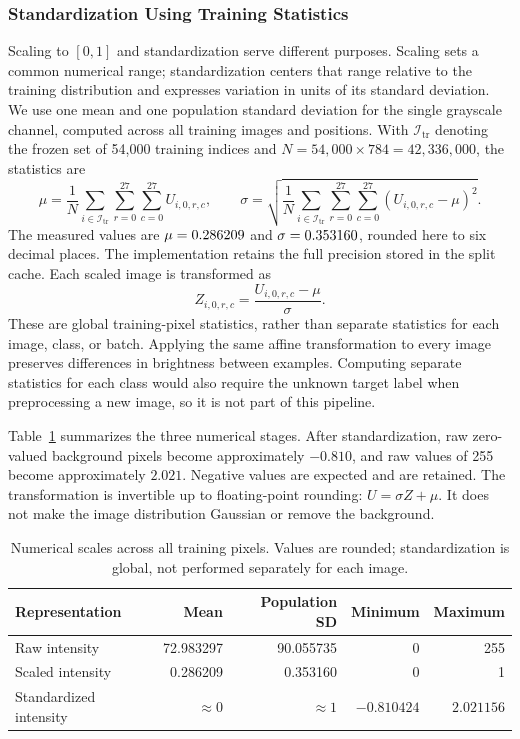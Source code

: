 \subsubsection{Standardization Using Training Statistics}
Scaling to \([0,1]\) and standardization serve different purposes. Scaling
sets a common numerical range; standardization centers that range relative
to the training distribution and expresses variation in units of its standard
deviation. We use one mean and one population standard deviation for the
single grayscale channel, computed across all training images and positions.
With \(\mathcal{I}_{\mathrm{tr}}\) denoting the frozen set of 54,000 training
indices and \(N=54{,}000\times784=42{,}336{,}000\), the statistics are
\begin{equation}
 \mu=\frac{1}{N}\sum_{i\in\mathcal{I}_{\mathrm{tr}}}
       \sum_{r=0}^{27}\sum_{c=0}^{27}U_{i,0,r,c},\qquad
 \sigma=\sqrt{\frac{1}{N}\sum_{i\in\mathcal{I}_{\mathrm{tr}}}
       \sum_{r=0}^{27}\sum_{c=0}^{27}(U_{i,0,r,c}-\mu)^2}.
 \label{eq:normalization_stats}
\end{equation}
The measured values are \(\mu=0.286209\) and \(\sigma=0.353160\),
rounded here to six decimal places. The implementation retains the full
precision stored in the split cache. Each scaled image is transformed as
\begin{equation}
 Z_{i,0,r,c}=\frac{U_{i,0,r,c}-\mu}{\sigma}.
 \label{eq:normalization}
\end{equation}
These are global training-pixel statistics, rather than separate statistics
for each image, class, or batch. Applying the same affine transformation to
every image preserves differences in brightness between examples. Computing
separate statistics for each class would also require the unknown target
label when preprocessing a new image, so it is not part of this pipeline.

Table~\ref{tab:preprocessing_scales} summarizes the three numerical stages.
After standardization, raw zero-valued background pixels become approximately
\(-0.810\), and raw values of 255 become approximately \(2.021\). Negative
values are expected and are retained. The transformation is invertible up to
floating-point rounding: \(U=\sigma Z+\mu\). It does not make the image
distribution Gaussian or remove the background.

\begin{table}[H]
\centering
\caption{Numerical scales across all training pixels. Values are rounded;
standardization is global, not performed separately for each image.}
\label{tab:preprocessing_scales}
\begin{tabular}{lrrrr}
\toprule
Representation & Mean & Population SD & Minimum & Maximum\\
\midrule
Raw intensity & 72.983297 & 90.055735 & 0 & 255\\
Scaled intensity & 0.286209 & 0.353160 & 0 & 1\\
Standardized intensity & $\approx0$ & $\approx1$ & $-0.810424$ & $2.021156$\\
\bottomrule
\end{tabular}
\end{table}

